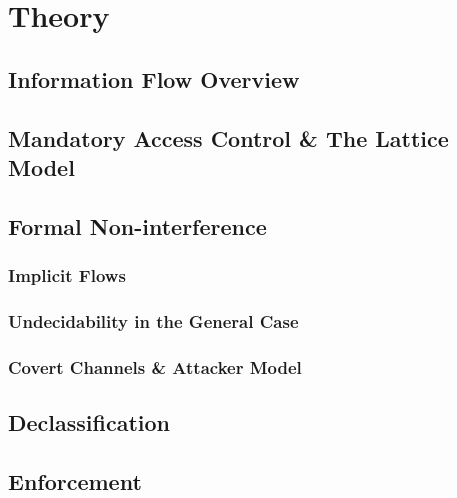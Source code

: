 \chapter{Theory} \label{chap_theory}

\section{Information Flow Overview}

\section{Mandatory Access Control \& The Lattice Model}

\section{Formal Non-interference}

	\subsection{Implicit Flows}
	
	\subsection{Undecidability in the General Case}

	\subsection{Covert Channels \& Attacker Model}

\section{Declassification}

\section{Enforcement}




